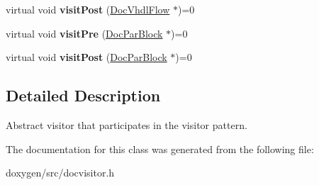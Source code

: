 \begin{Indent}
\begin{DoxyCompactItemize}
virtual void {\bfseries visit\+Post} (\mbox{\hyperlink{class_doc_vhdl_flow}{Doc\+Vhdl\+Flow}} $\ast$)=0
\item 
\mbox{\label{class_doc_visitor_a3545acbb5cf745cb1cb49aa237b53ead}} 
virtual void {\bfseries visit\+Pre} (\mbox{\hyperlink{class_doc_par_block}{Doc\+Par\+Block}} $\ast$)=0
\item 
\mbox{\label{class_doc_visitor_a3c24f63acb77c3b728ee668067899b7d}} 
virtual void {\bfseries visit\+Post} (\mbox{\hyperlink{class_doc_par_block}{Doc\+Par\+Block}} $\ast$)=0
\end{DoxyCompactItemize}
\end{Indent}


\subsection{Detailed Description}
Abstract visitor that participates in the visitor pattern. 

The documentation for this class was generated from the following file\+:\begin{DoxyCompactItemize}
\item 
doxygen/src/docvisitor.\+h\end{DoxyCompactItemize}
